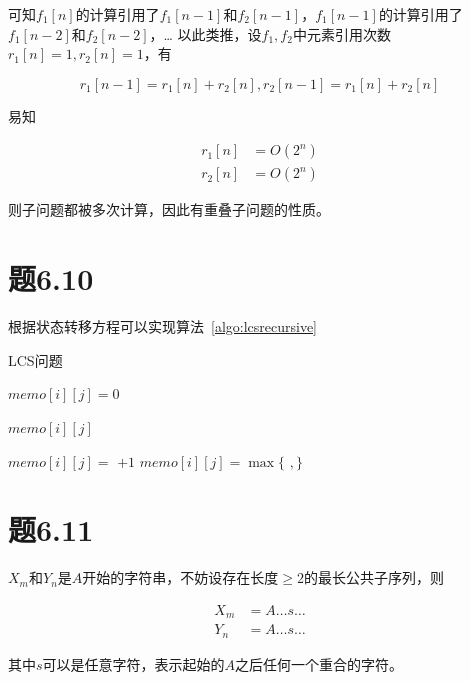 \documentclass[a4paper,twoside]{article}
\begin{document}
\begin{spacing}{1.2}
可知$f_1[n]$的计算引用了$f_1[n-1]$和$f_2[n-1]$，$f_1[n-1]$的计算引用了$f_1[n-2]$和$f_2[n-2]$，\ldots
以此类推，设$f_1,f_2$中元素引用次数$r_1[n]=1, r_2[n]=1$，有

$$
r_1[n-1]=r_1[n]+r_2[n], r_2[n-1]=r_1[n]+r_2[n]
$$

易知

\begin{align*}
	r_1[n] &= O(2^n) \\
	r_2[n] &= O(2^n)
\end{align*}

则子问题都被多次计算，因此有重叠子问题的性质。

\section{题6.10}

根据状态转移方程可以实现算法~\ref{algo:lcsrecursive}

\begin{algorithm}
	\caption{LCS问题}
	\label{algo:lcsrecursive}
	\begin{algorithmic}[1]
		
		
		\State \Return $memo[i][j]=0$
		\EndIf
		
		\State \Return $memo[i][j]$
		\EndIf
		
		\State \Return $memo[i][j]=$ $+1$
		\Else
		\State \Return  $memo[i][j]=\max \{$ $,$$\}$
		\EndIf
		
		\EndProcedure
	\end{algorithmic}
\end{algorithm}	

\section{题6.11}

$X_m$和$Y_n$是$A$开始的字符串，不妨设存在长度$\ge 2$的最长公共子序列，则

\begin{align*}
	X_m &= A\ldots s\ldots \\
	Y_n &= A\ldots s\ldots
\end{align*}

其中$s$可以是任意字符，表示起始的$A$之后任何一个重合的字符。


\end{spacing}
\end{document}
